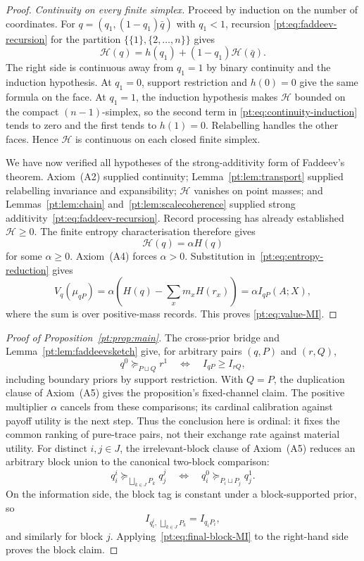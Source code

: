 \documentclass[11pt,a4paper]{article}
\theoremstyle{definition}
\newcommand{\Sh}{H}
\newcommand{\1}{\mathbf 1}
\begin{document}
\begin{proof}
\emph{Continuity on every finite simplex.}
Proceed by induction on the number of coordinates.  For
$q=(q_1,(1-q_1)\bar q)$ with $q_1<1$, recursion
\eqref{pt:eq:faddeev-recursion} for the partition
$\{\{1\},\{2,\ldots,n\}\}$ gives
\begin{equation}
 \mathcal H(q)=h(q_1)+(1-q_1)\mathcal H(\bar q).
\label{pt:eq:continuity-induction}
\end{equation}
The right side is continuous away from $q_1=1$ by binary continuity and the
induction hypothesis.  At $q_1=0$, support restriction and $h(0)=0$ give
the same formula on the face.  At $q_1=1$, the induction hypothesis makes
$\mathcal H$ bounded on the compact $(n-1)$-simplex, so the second term in
\eqref{pt:eq:continuity-induction} tends to zero and the first tends to
$h(1)=0$.  Relabelling handles the other faces.  Hence $\mathcal H$ is
continuous on each closed finite simplex.

We have now verified all hypotheses of the strong-additivity form of
Faddeev's theorem.  Axiom~\textup{(A2)} supplied continuity;
Lemma~\ref{pt:lem:transport} supplied relabelling invariance and
expansibility; $\mathcal H$ vanishes on point masses; and
Lemmas~\ref{pt:lem:chain} and~\ref{pt:lem:scalecoherence} supplied strong
additivity~\eqref{pt:eq:faddeev-recursion}.  Record processing has already
established $\mathcal H\ge0$.  The finite entropy characterisation
\cite[Theorem~6]{BaezFritzLeinster2011} therefore gives
\[
 \mathcal H(q)=\alpha\Sh(q)
\]
for some $\alpha\ge0$.  Axiom~\textup{(A4)} forces $\alpha>0$.
Substitution in~\eqref{pt:eq:entropy-reduction} gives
\[
 V_q(\mu_{qP})
 =\alpha\left(\Sh(q)-\sum_x m_x\Sh(r_x)\right)
 =\alpha I_{qP}(A;X),
\]
where the sum is over positive-mass records.  This proves
\eqref{pt:eq:value-MI}.
\end{proof}

\begin{proof}[Proof of Proposition~\ref{pt:prop:main}]
The cross-prior bridge and Lemma~\ref{pt:lem:faddeevsketch} give, for arbitrary
pairs $(q,P)$ and $(r,Q)$,
\[
 q^0\succeq_{P\sqcup Q}r^1
 \quad\Longleftrightarrow\quad
 I_{qP}\ge I_{rQ},
\tag{BMI}\label{pt:eq:final-block-MI}
\]
including boundary priors by support restriction.  With $Q=P$, the
duplication clause of Axiom~\textup{(A5)} gives the proposition's fixed-channel
claim.  The positive multiplier $\alpha$ cancels from these comparisons; its
cardinal calibration against payoff utility is the next step.  Thus the
conclusion here is ordinal: it fixes the common ranking of pure-trace pairs,
not their exchange rate against material utility.  For distinct
$i,j\in J$, the irrelevant-block clause of Axiom~\textup{(A5)} reduces an
arbitrary block union to the canonical two-block comparison:
\[
 q_i^i\succeq_{\bigsqcup_{k\in J}P_k}q_j^j
 \quad\Longleftrightarrow\quad
 q_i^0\succeq_{P_i\sqcup P_j}q_j^1.
\]
On the information side, the block tag is constant under a block-supported
prior, so
\[
 I_{q_i^i,\,\bigsqcup_{k\in J}P_k}=I_{q_iP_i},
\]
and similarly for block $j$.  Applying~\eqref{pt:eq:final-block-MI} to the
right-hand side proves the block claim.
\end{proof}
\end{document}

